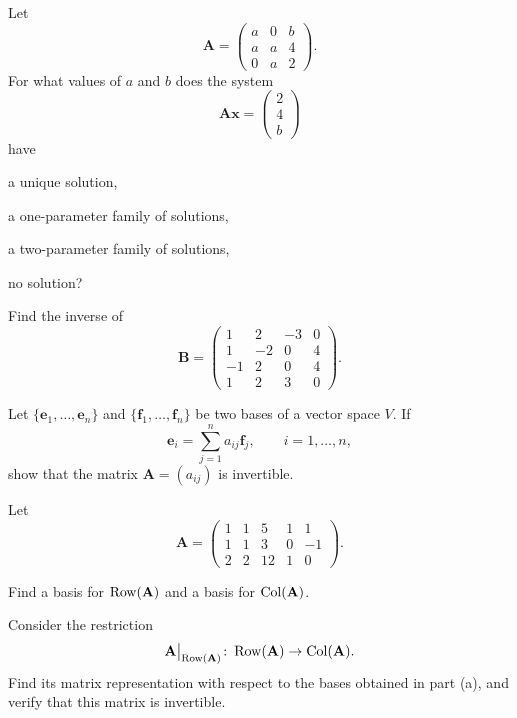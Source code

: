 \documentclass[11pt,oneside]{article}
\begin{document}
\begin{problem}
Let
\[
\mathbf A=
\begin{pmatrix}
a&0&b\\
a&a&4\\
0&a&2
\end{pmatrix}.
\]
For what values of $a$ and $b$ does the system
\[
\mathbf A\mathbf x=
\begin{pmatrix}
2\\4\\b
\end{pmatrix}
\]
have
\begin{problemchoices}
\item a unique solution,
\item a one-parameter family of solutions,
\item a two-parameter family of solutions,
\item no solution?
\end{problemchoices}
\end{problem}

\begin{problem}
Find the inverse of
\[
\mathbf B=
\begin{pmatrix}
1&2&-3&0\\
1&-2&0&4\\
-1&2&0&4\\
1&2&3&0
\end{pmatrix}.
\]
\end{problem}

\begin{problem}
Let $\{\mathbf e_1,\dots,\mathbf e_n\}$ and $\{\mathbf f_1,\dots,\mathbf f_n\}$ be two bases of a vector space $V$. If
\[
\mathbf e_i=\sum_{j=1}^n a_{ij}\mathbf f_j,
\qquad i=1,\dots,n,
\]
show that the matrix $\mathbf A=(a_{ij})$ is invertible.
\end{problem}

\begin{problem}
Let
\[
\mathbf A=
\begin{pmatrix}
1&1&5&1&1\\
1&1&3&0&-1\\
2&2&12&1&0
\end{pmatrix}.
\]
\begin{problemsubparts}
\item Find a basis for $\operatorname{Row}(\mathbf A)$ and a basis for $\operatorname{Col}(\mathbf A)$.
\item Consider the restriction
\[
\mathbf A\big|_{\operatorname{Row}(\mathbf A)}\colon \operatorname{Row}(\mathbf A)\to\operatorname{Col}(\mathbf A).
\]
Find its matrix representation with respect to the bases obtained in part \textup{(a)}, and verify that this matrix is invertible.
\end{problemsubparts}
\end{problem}
\end{document}
